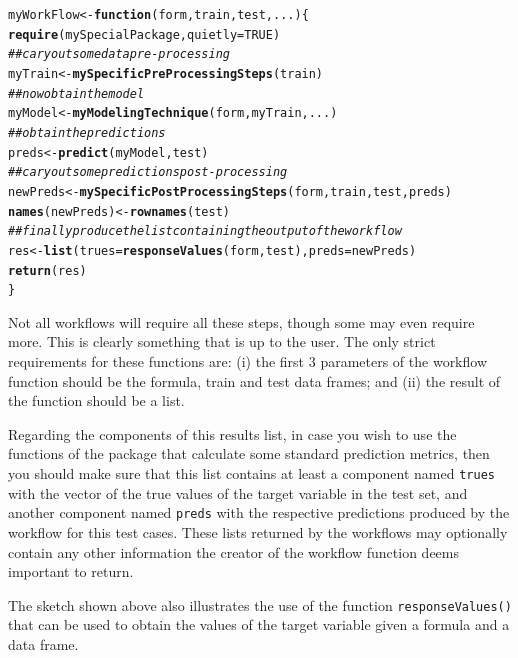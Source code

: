 \documentclass[10pt,a4paper]{article}\usepackage[]{graphicx}\usepackage[]{color}
\makeatletter
\newcommand{\hlnum}[1]{\textcolor[rgb]{0.686,0.059,0.569}{#1}}%
\newcommand{\hlcom}[1]{\textcolor[rgb]{0.678,0.584,0.686}{\textit{#1}}}%
\newcommand{\hlstd}[1]{\textcolor[rgb]{0.345,0.345,0.345}{#1}}%
\newcommand{\hlkwa}[1]{\textcolor[rgb]{0.161,0.373,0.58}{\textbf{#1}}}%
\newcommand{\hlkwb}[1]{\textcolor[rgb]{0.69,0.353,0.396}{#1}}%
\newcommand{\hlkwc}[1]{\textcolor[rgb]{0.333,0.667,0.333}{#1}}%
\newcommand{\hlkwd}[1]{\textcolor[rgb]{0.737,0.353,0.396}{\textbf{#1}}}%
\newenvironment{kframe}{%
 \def\at@end@of@kframe{}%
 \ifinner\ifhmode%
  \def\at@end@of@kframe{\end{minipage}}%
  \begin{minipage}{\columnwidth}%
 \fi\fi%
 \def\FrameCommand##1{\hskip\@totalleftmargin \hskip-\fboxsep
 \colorbox{shadecolor}{##1}\hskip-\fboxsep
     \hskip-\linewidth \hskip-\@totalleftmargin \hskip\columnwidth}%
 \MakeFramed {\advance\hsize-\width
   \@totalleftmargin\z@ \linewidth\hsize
   \@setminipage}}%
 {\par\unskip\endMakeFramed%
 \at@end@of@kframe}
\newenvironment{knitrout}{}{} %
\makeatother
\begin{document}
\begin{knitrout}\footnotesize
{}\color{fgcolor}\begin{kframe}
\begin{alltt}
\hlstd{myWorkFlow} \hlkwb{<-} \hlkwa{function}\hlstd{(}\hlkwc{form}\hlstd{,}\hlkwc{train}\hlstd{,}\hlkwc{test}\hlstd{,}\hlkwc{...}\hlstd{) \{}
  \hlkwd{require}\hlstd{(mySpecialPackage,}\hlkwc{quietly}\hlstd{=}\hlnum{TRUE}\hlstd{)}
  \hlcom{## cary out some data pre-processing}
  \hlstd{myTrain} \hlkwb{<-} \hlkwd{mySpecificPreProcessingSteps}\hlstd{(train)}
  \hlcom{## now obtain the model}
  \hlstd{myModel} \hlkwb{<-} \hlkwd{myModelingTechnique}\hlstd{(form,myTrain,...)}
  \hlcom{## obtain the predictions}
  \hlstd{preds} \hlkwb{<-} \hlkwd{predict}\hlstd{(myModel,test)}
  \hlcom{## cary out some predictions post-processing}
  \hlstd{newPreds} \hlkwb{<-} \hlkwd{mySpecificPostProcessingSteps}\hlstd{(form,train,test,preds)}
  \hlkwd{names}\hlstd{(newPreds)} \hlkwb{<-} \hlkwd{rownames}\hlstd{(test)}
  \hlcom{## finally produce the list containing the output of the workflow}
  \hlstd{res} \hlkwb{<-} \hlkwd{list}\hlstd{(}\hlkwc{trues}\hlstd{=}\hlkwd{responseValues}\hlstd{(form,test),}\hlkwc{preds}\hlstd{=newPreds)}
  \hlkwd{return}\hlstd{(res)}
\hlstd{\}}
\end{alltt}
\end{kframe}
\end{knitrout}


Not all workflows will require all these steps, though some may even
require more. This is clearly something that is up to the user. The
only strict requirements for these functions are: (i) the first 3
parameters of the workflow function should be the formula, train and
test data frames; and (ii) the result of the function should be a list. 

Regarding the components of this results list, in case you wish to use the functions of the package that calculate some standard prediction metrics, then you should make sure that this list contains at least a component named \texttt{trues} with the vector of the true values of the target variable in the test set, and another component named \texttt{preds} with the respective predictions produced by the workflow for this test cases.
 These lists returned by the workflows  may optionally contain any other information the creator of the workflow function deems
important to return. 

The sketch shown above also illustrates the use of the function
\texttt{responseValues()} that can be used to obtain the values of the target
variable given a formula and a data frame.
\end{document}
